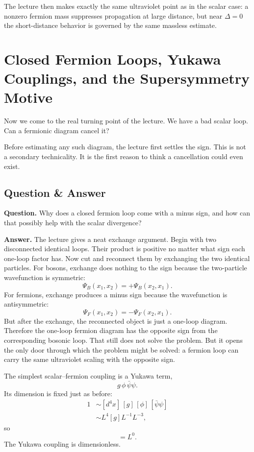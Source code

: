 The lecture then makes exactly the same ultraviolet point as in the scalar case: a nonzero fermion mass suppresses propagation at large distance, but near \(\Delta=0\) the short-distance behavior is governed by the same massless estimate.

\section{Closed Fermion Loops, Yukawa Couplings, and the Supersymmetry Motive}

Now we come to the real turning point of the lecture. We have a bad scalar loop. Can a fermionic diagram cancel it?

Before estimating any such diagram, the lecture first settles the sign. This is not a secondary technicality. It is the first reason to think a cancellation could even exist.

\subsection{Question \& Answer}

\textbf{Question.} Why does a closed fermion loop come with a minus sign, and how can that possibly help with the scalar divergence?

\textbf{Answer.} The lecture gives a neat exchange argument. Begin with two disconnected identical loops. Their product is positive no matter what sign each one-loop factor has. Now cut and reconnect them by exchanging the two identical particles. For bosons, exchange does nothing to the sign because the two-particle wavefunction is symmetric:
\begin{equation}
\Psi_B(x_1,x_2)=+\Psi_B(x_2,x_1).
\end{equation}
For fermions, exchange produces a minus sign because the wavefunction is antisymmetric:
\begin{equation}
\Psi_F(x_1,x_2)=-\Psi_F(x_2,x_1).
\end{equation}
But after the exchange, the reconnected object is just a one-loop diagram. Therefore the one-loop fermion diagram has the opposite sign from the corresponding bosonic loop. That still does not solve the problem. But it opens the only door through which the problem might be solved: a fermion loop can carry the same ultraviolet scaling with the opposite sign.

The simplest scalar--fermion coupling is a Yukawa term,
\begin{equation}
g\,\phi\,\bar\psi\psi .
\end{equation}
Its dimension is fixed just as before:
\begin{align}
1 &\sim [d^4x]\,[g]\,[\phi]\,[\bar\psi\psi] \\
  &\sim L^4 [g] L^{-1} L^{-3},
\end{align}
so
\begin{equation}
[g]=L^0.
\end{equation}
The Yukawa coupling is dimensionless.


